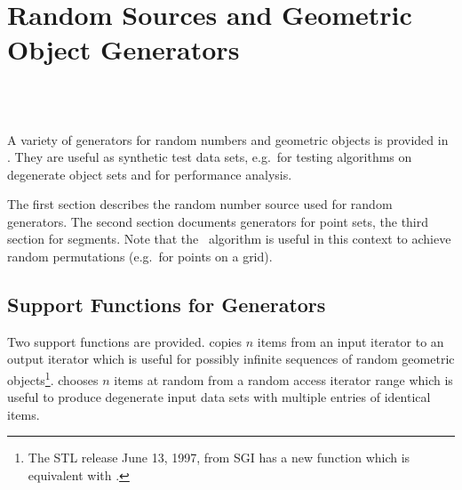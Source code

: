 
\beforecprogskip\medskipamount
\aftercprogskip\medskipamount
\ccParDims

\chapter{Random Sources and Geometric Object Generators}
\label{chapterGenerators}
\\
\\


A variety of generators for random numbers and geometric objects is
provided in \cgal.  They are useful as synthetic test data sets,
e.g.~for testing algorithms on degenerate object sets and for
performance analysis.

The first section describes the random number source used for random
generators. The second section documents generators for point sets,
the third section for segments. Note that the \stl\ algorithm
 is useful in this context to achieve random
permutations (e.g.~for points on a grid).




\section{Support Functions for Generators}

Two support functions are provided.  copies $n$
items from an input iterator to an output iterator which is useful for
possibly infinite sequences of random geometric objects\footnote{%
The STL release June 13, 1997, from SGI has a new function  which is equivalent with .}.
 chooses $n$ items at random from a random
access iterator range which is useful to produce degenerate input data
sets with multiple entries of identical items.

